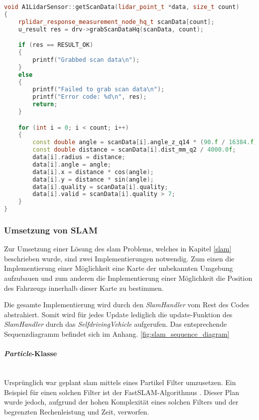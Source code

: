 \begin{lstlisting}[caption={Auslesen der LiDAR Daten},label={lst:auslesen_lidar},language={C++}]
void A1LidarSensor::getScanData(lidar_point_t *data, size_t count)
{
    rplidar_response_measurement_node_hq_t scanData[count];
    u_result res = drv->grabScanDataHq(scanData, count);

    if (res == RESULT_OK)
    {
        printf("Grabbed scan data\n");
    }
    else
    {
        printf("Failed to grab scan data\n");
        printf("Error code: %d\n", res);
        return;
    }

    for (int i = 0; i < count; i++)
    {
        const double angle = scanData[i].angle_z_q14 * (90.f / 16384.f);
        const double distance = scanData[i].dist_mm_q2 / 4000.0f;
        data[i].radius = distance;
        data[i].angle = angle;
        data[i].x = distance * cos(angle);
        data[i].y = distance * sin(angle);
        data[i].quality = scanData[i].quality;
        data[i].valid = scanData[i].quality > 7;
    }
}
\end{lstlisting}

\subsubsection{Umsetzung von SLAM}
\label{slamImplementierung}

Zur Umsetzung einer Lösung des \ac{slam} Problems, welches in Kapitel \ref{slam} beschrieben wurde, sind zwei Implementierungen notwendig.
Zum einen die Implementierung einer Möglichkeit eine Karte der unbekannten Umgebung aufzubauen 
und zum anderen die Implementierung einer Möglichkeit die Position des Fahrzeugs innerhalb dieser Karte zu bestimmen.

Die gesamte Implementierung wird durch den \textit{SlamHandler} vom Rest des Codes abstrahiert.
Somit wird für jedes Update lediglich die update-Funktion des \textit{SlamHandler} durch das \textit{SelfdrivingVehicle} aufgerufen.
Das entsprechende Sequenzdiagramm befindet sich im Anhang. \ref{fig:slam_sequence_diagram}

\paragraph{\textit{Particle}-Klasse} \mbox{} \\
Ursprünglich war geplant \ac{slam} mittels eines Partikel Filter umzusetzen.
Ein Beispiel für einen solchen Filter ist der FastSLAM-Algorithmus \cite{montemerlo2002fastslam}.
Dieser Plan wurde jedoch, aufgrund der hohen Komplexität eines solchen Filters und der begrenzten Rechenleistung und Zeit, verworfen.

